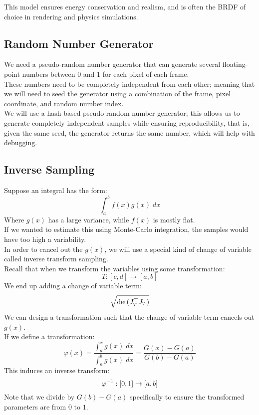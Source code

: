 \documentclass[12pt]{article}
\begin{document}
This model ensures energy conservation and 
realism, and is often the BRDF of choice
in rendering and physics simulations. \\

\newpage

\subsection*{Random Number Generator}

We need a pseudo-random number generator that
can generate several 
floating-point numbers between $0$
and $1$ for each pixel of each frame. \\

These numbers need to be completely independent
from each other; meaning that we will need to
seed the generator using a combination of the frame,
pixel coordinate, and random number index. \\

We will use a hash based pseudo-random number
generator; this allows us to generate completely
independent samples while ensuring reproducibility,
that is, given the same seed, the generator returns
the same number, which will help with debugging. \\

\newpage

\subsection*{Inverse Sampling}

Suppose an integral has the form:
\[ \int_a^b f(x)g(x)\;dx \]
Where $g(x)$ has a large variance,
while $f(x)$ is mostly flat. \\

If we wanted to estimate this using
Monte-Carlo integration, the samples would have
too high a variability. \\

In order to cancel out the $g(x)$,
we will use a special kind of change of variable
called inverse transform sampling. \\

Recall that when we transform the variables
using some transformation:
\[ T: [c, d] \to [a, b] \]
We end up adding a change of variable term:
\[ \sqrt{\vs{100}\det(J_T^\top J_T)} \]
We can design a transformation such that the
change of variable term cancels out $g(x)$. \\

If we define a transformation:
\[ \varphi(x) = \dfrac{\int_a^x g(x) \;dx}
{\int_a^b g(x) \;dx}
= \dfrac{G(x) - G(a)}
{G(b) - G(a)} \]
This induces an inverse transform:
\[ \varphi^{-1}: [0, 1] \to [a, b] \]
Note that we divide by $G(b) - G(a)$
specifically to ensure the transformed parameters
are from $0$ to $1$. \\
\end{document}
